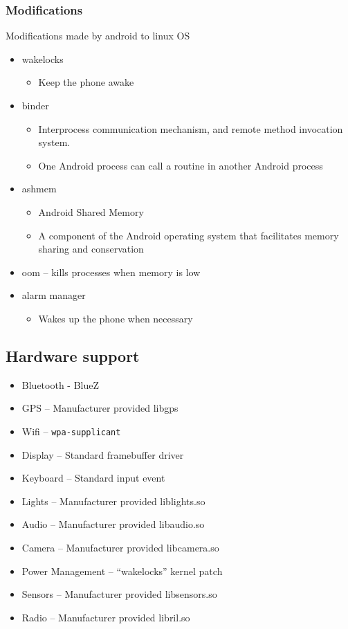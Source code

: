 \documentclass{article}
\begin{document}
\begin{multicols}{2}

\subsubsection{Modifications}

\begin{flushleft}
  Modifications made by android to linux OS
\end{flushleft}
\begin{itemize}
  \item wakelocks
  \begin{itemize}
  	\item Keep the phone awake
  \end{itemize}
  \item binder
  	\begin{itemize}
  		\item Interprocess communication mechanism, and remote method invocation system.
  		\item One Android process can call a routine in another Android process
  	\end{itemize}
  \item ashmem
  \begin{itemize}
  	\item Android Shared Memory
  	\item A component of the Android operating system that facilitates memory sharing and conservation
  \end{itemize}
  \item oom – kills processes when memory is low
  \item alarm manager
  \begin{itemize}
  	\item Wakes up the phone when necessary
  \end{itemize}
\end{itemize}

\vfill\null

\subsection{Hardware support}
\begin{itemize}
  \item Bluetooth - BlueZ
  \item GPS – Manufacturer provided libgps
  \item Wifi – \texttt{wpa-supplicant}
  \item Display – Standard framebuffer driver
  \item Keyboard – Standard input event
  \item Lights – Manufacturer provided liblights.so
  \item Audio – Manufacturer provided libaudio.so
  \item Camera – Manufacturer provided libcamera.so
  \item Power Management – “wakelocks” kernel patch
  \item Sensors – Manufacturer provided libsensors.so
  \item Radio – Manufacturer provided libril.so
\end{itemize}


\end{multicols}
\end{document}
